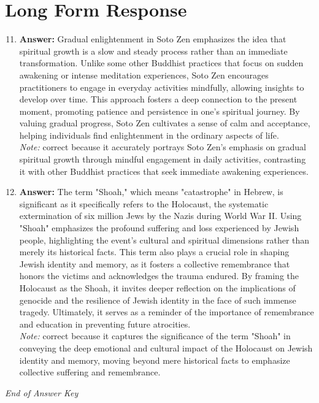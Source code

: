 \documentclass[12pt]{article}
\begin{document}
\section*{Long Form Response}
\begin{enumerate}[label=\arabic*.]
\setcounter{enumi}{10}
\item \textbf{Answer:} Gradual enlightenment in Soto Zen emphasizes the idea that spiritual growth is a slow and steady process rather than an immediate transformation. Unlike some other Buddhist practices that focus on sudden awakening or intense meditation experiences, Soto Zen encourages practitioners to engage in everyday activities mindfully, allowing insights to develop over time. This approach fosters a deep connection to the present moment, promoting patience and persistence in one's spiritual journey. By valuing gradual progress, Soto Zen cultivates a sense of calm and acceptance, helping individuals find enlightenment in the ordinary aspects of life.
\\ \textit{Note:} correct because it accurately portrays Soto Zen's emphasis on gradual spiritual growth through mindful engagement in daily activities, contrasting it with other Buddhist practices that seek immediate awakening experiences.
\item \textbf{Answer:} The term "Shoah," which means "catastrophe" in Hebrew, is significant as it specifically refers to the Holocaust, the systematic extermination of six million Jews by the Nazis during World War II. Using "Shoah" emphasizes the profound suffering and loss experienced by Jewish people, highlighting the event's cultural and spiritual dimensions rather than merely its historical facts. This term also plays a crucial role in shaping Jewish identity and memory, as it fosters a collective remembrance that honors the victims and acknowledges the trauma endured. By framing the Holocaust as the Shoah, it invites deeper reflection on the implications of genocide and the resilience of Jewish identity in the face of such immense tragedy. Ultimately, it serves as a reminder of the importance of remembrance and education in preventing future atrocities.
\\ \textit{Note:} correct because it captures the significance of the term "Shoah" in conveying the deep emotional and cultural impact of the Holocaust on Jewish identity and memory, moving beyond mere historical facts to emphasize collective suffering and remembrance.
\end{enumerate}

\vfill
\noindent\textit{End of Answer Key}
\end{document}
